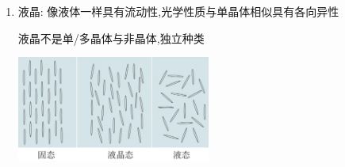 \documentclass{article}
\begin{document}
\begin{enumerate}
\begin{enumerate}[label = (\arabic*)]
\begin{minipage}{0.7\textwidth}
                        非浸润时尽可能排斥固体分子(水银液面下降)

                        试管越细,那么管内的液体则越少,毛细现象越明显

                        \vspace{-1em}
                        \hspace{-0.9em}\begin{adjustbox}{minipage=0.7\linewidth, bgcolor=gray!20, padding=1em}
                            \small
                            液面上升高度 $\, h= \dfrac{2\gamma \cos{\theta}}{\rho gr} \quad $($\theta$:液面切线与固体面所成锐角)

                            $\gamma$:表面张力系数;$\quad \theta$:接触角;$\quad \rho$:液体密度;$\quad r$:试管半径
                        \end{adjustbox}
                        \vspace{-1em}

                        下雨\textbf{踩土}(减少土壤缝隙宽度)\textbf{加强}毛细现象,减少树木根部积水

                        下雨\textbf{刨土}(使得土壤不再有缝隙)\textbf{破坏}毛细现象,增加树木根部水量
                    \end{minipage}
          \end{enumerate}

    \item 液晶: 像液体一样具有流动性,光学性质与单晶体相似具有各向异性

          \hspace{2.4em} 液晶不是单/多晶体与非晶体,独立种类

          \begin{center}
              \includegraphics[width = 0.5\textwidth]{./pictures/25.png}
          \end{center}
\end{enumerate}

\vspace{2em}
\end{document}
